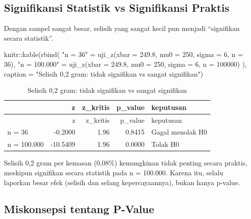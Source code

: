 \documentclass[
  indonesian,
  letterpaper,
]{book}
\newenvironment{Shaded}{\begin{snugshade}}{\end{snugshade}}
\newcommand{\AttributeTok}[1]{\textcolor[rgb]{0.40,0.45,0.13}{#1}}
\newcommand{\DecValTok}[1]{\textcolor[rgb]{0.68,0.00,0.00}{#1}}
\newcommand{\FloatTok}[1]{\textcolor[rgb]{0.68,0.00,0.00}{#1}}
\newcommand{\FunctionTok}[1]{\textcolor[rgb]{0.28,0.35,0.67}{#1}}
\newcommand{\NormalTok}[1]{\textcolor[rgb]{0.00,0.23,0.31}{#1}}
\newcommand{\OtherTok}[1]{\textcolor[rgb]{0.00,0.23,0.31}{#1}}
\newcommand{\SpecialCharTok}[1]{\textcolor[rgb]{0.37,0.37,0.37}{#1}}
\newcommand{\StringTok}[1]{\textcolor[rgb]{0.13,0.47,0.30}{#1}}
\begin{document}
\subsection{Signifikansi Statistik vs Signifikansi
Praktis}\label{signifikansi-statistik-vs-signifikansi-praktis}

Dengan sampel sangat besar, selisih yang sangat kecil pun menjadi
``signifikan secara statistik''.

\begin{Shaded}
\begin{Highlighting}[]
\NormalTok{knitr}\SpecialCharTok{::}\FunctionTok{kable}\NormalTok{(}\FunctionTok{rbind}\NormalTok{(}
  \StringTok{"n = 36"}      \OtherTok{=} \FunctionTok{uji\_z}\NormalTok{(}\AttributeTok{xbar =} \FloatTok{249.8}\NormalTok{, }\AttributeTok{mu0 =} \DecValTok{250}\NormalTok{, }\AttributeTok{sigma =} \DecValTok{6}\NormalTok{, }\AttributeTok{n =} \DecValTok{36}\NormalTok{),}
  \StringTok{"n = 100.000"} \OtherTok{=} \FunctionTok{uji\_z}\NormalTok{(}\AttributeTok{xbar =} \FloatTok{249.8}\NormalTok{, }\AttributeTok{mu0 =} \DecValTok{250}\NormalTok{, }\AttributeTok{sigma =} \DecValTok{6}\NormalTok{, }\AttributeTok{n =} \DecValTok{100000}\NormalTok{)}
\NormalTok{), }\AttributeTok{caption =} \StringTok{"Selisih 0,2 gram: tidak signifikan vs sangat signifikan"}\NormalTok{)}
\end{Highlighting}
\end{Shaded}

\begin{longtable}[]{@{}lrrrl@{}}
\caption{Selisih 0,2 gram: tidak signifikan vs sangat
signifikan}\tabularnewline
\toprule\noalign{}
& z & z\_kritis & p\_value & keputusan \\
\midrule\noalign{}
\endfirsthead
\toprule\noalign{}
& z & z\_kritis & p\_value & keputusan \\
\midrule\noalign{}
\endhead
\bottomrule\noalign{}
\endlastfoot
n = 36 & -0.2000 & 1.96 & 0.8415 & Gagal menolak H0 \\
n = 100.000 & -10.5409 & 1.96 & 0.0000 & Tolak H0 \\
\end{longtable}

Selisih 0,2 gram per kemasan (0,08\%) kemungkinan tidak penting secara
praktis, meskipun signifikan secara statistik pada n = 100.000. Karena
itu, selalu laporkan besar efek (selisih dan selang kepercayaannya),
bukan hanya p-value.

\subsection{Miskonsepsi tentang
P-Value}\label{miskonsepsi-tentang-p-value}
\end{document}
